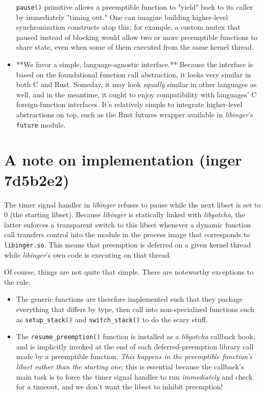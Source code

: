 \documentclass[12pt,letterpaper]{book}
\begin{document}
\begin{itemize}
	\texttt{pause()} primitive allows a preemptible function to "yield" back to its caller by immediately
	"timing out."  One can imagine building higher-level synchronization constructs atop this; for
	example, a custom mutex that paused instead of blocking would allow two or more preemptible
	functions to share state, even when some of them executed from the same kernel thread.
\item **We favor a simple, language-agnostic interface.**  Because the interface is based on the
	foundational function call abstraction, it looks very similar in both C and Rust.  Someday, it
	may look \textit{equally} similar in other languages as well, and in the meantime, it ought to enjoy
	compatibility with languages' C foreign-function interfaces.  It's relatively simple to integrate
	higher-level abstractions on top, such as the Rust futures wrapper available in \textit{libinger}'s
	\texttt{future} module.
\end{itemize}


\section{A note on implementation (inger 7d5b2e2)}

The timer signal handler in \textit{libinger} refuses to pause while the next libset is set to 0 (the
starting libset).  Because \textit{libinger} is statically linked with \textit{libgotcha}, the latter enforces a
transparent switch to this libset whenever a dynamic function call transfers control into the module
in the process image that corresponds to \texttt{libinger.so}.  This means that preemption is deferred on a
given kernel thread while \textit{libinger}'s own code is executing on that thread.

Of course, things are not quite that simple.  There are noteworthy exceptions to the rule:
\begin{itemize}
\item The generic
	functions are therefore implemented such that they package everything that differs by type, then
	call into non-specialized functions such as \texttt{setup\_stack()} and \texttt{switch\_stack()} to do the scary
	stuff.
\item The \texttt{resume\_preemption()} function is installed as a \textit{libgotcha} callback hook, and is implicitly
	invoked at the end of each deferred-preemption library call made by a preemptible function.
	\textit{This happens in the preemptible function's libset rather than the starting one}; this is
	essential because the callback's main task is to force the timer signal handler to run
	\textit{immediately} and check for a timeout, and we don't want the libset to inhibit preemption!
\end{itemize}
\end{document}
